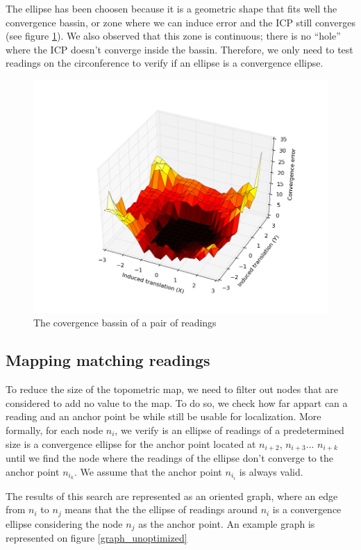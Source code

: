 \documentclass[letterpaper,10 pt,conference]{ieeeconf}
\begin{document}
The ellipse has been choosen because it is a geometric shape that fits well the convergence bassin, or zone where we can induce error and the ICP still
converges (see figure \ref{convergence_bassin}). We also observed that this zone is continuous; there is no ``hole'' where the ICP doesn't converge inside the bassin.
Therefore, we only need to test readings on the circonference to verify if an ellipse is a convergence ellipse.


\begin{figure}[thpb]
  \centering
  \includegraphics[scale=0.4]{convergence_bassin}
  \caption{The covergence bassin of a pair of readings}
  \label{convergence_bassin}
\end{figure}

\subsection{Mapping matching readings}
To reduce the size of the topometric map, we need to filter out nodes that are considered to add no value to the map. To do so,
we check how far appart can a reading and an anchor point be while still be usable for localization. More formally, for each node
$n_i$, we verify is an ellipse of readings of a predetermined size is a convergence ellipse for the anchor point located at $n_{i+2}$,
$n_{i+3}$... $n_{i+k}$ until we find the node  where the readings of the ellipse don't converge to the anchor point $n_{i_k}$. We assume
that the anchor point $n_{i_i}$ is always valid.


The results of this search are represented as an oriented graph, where an edge from $n_{i}$ to $n_{j}$ means that the the ellipse of readings
around $n_{i}$ is a convergence ellipse considering the node $n_j$ as the anchor point. An example graph is represented on figure \ref{graph_unoptimized}
\end{document}

